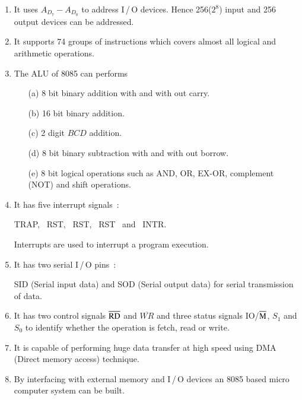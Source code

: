 \begin{enumerate}
\item It uses $A_{D_{7}}-A_{D_{0}}$ to address I\,/\,O devices. Hence 256($2^8$) input and 256 output devices can be addressed.

\item It supports 74 groups of instructions which covers almost all logical and arithmetic operations.

\item The ALU of 8085 can performs
\begin{itemize}
\item[(a)] 8 bit binary addition with and with out carry.

\item[(b)] 16 bit binary addition.

\eject

\item[(c)] 2 digit $BCD$ addition.

\item[(d)] 8 bit binary subtraction with and with out borrow.

\item[(e)] 8 bit logical operations such as AND, OR, EX-OR, complement (NOT) and shift operations.
\end{itemize}

\item It has five interrupt signals~:
\begin{center}
TRAP, \ RST, \ RST, \ RST \ and \ INTR.
\end{center}
Interrupts are used to interrupt a program execution.

\item It has two serial I\,/\,O pins~:

SID (Serial input data) and SOD (Serial output data) for serial transmission of data.

\item It has two control signals $\overline{\rm RD}$ and $\overline{WR}$ and three status signals IO/$\overline{\rm M}$, $S_{1}$ and $S_{0}$ to identify whether the operation is fetch, read or write.

\item It is capable of performing huge data transfer at high speed using DMA (Direct memory access) technique.

\item By interfacing with external memory and I\,/\,O devices an 8085 based micro computer system can be built.
\end{enumerate}

